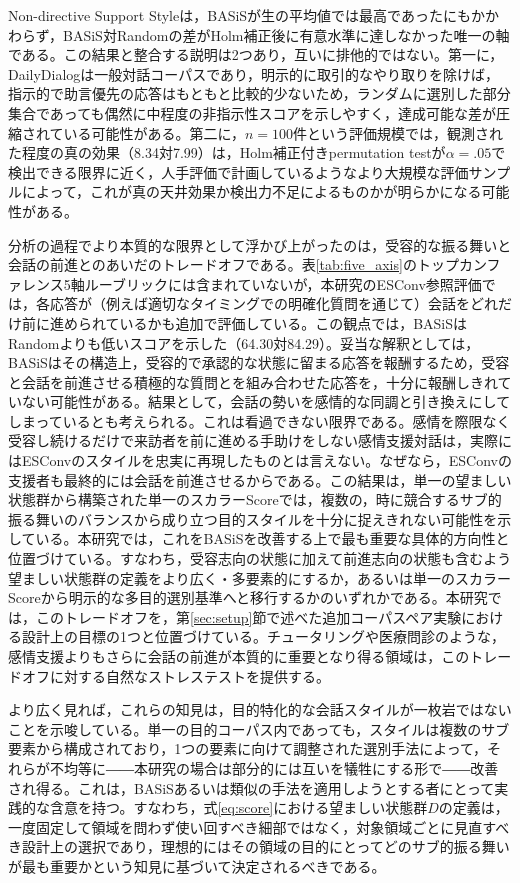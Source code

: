 \documentclass[manuscript,review,anonymous]{acmart}
\begin{document}
Non-directive Support Styleは，BASiSが生の平均値では最高であったにもかかわらず，BASiS対Randomの差がHolm補正後に有意水準に達しなかった唯一の軸である。この結果と整合する説明は2つあり，互いに排他的ではない。第一に，DailyDialogは一般対話コーパスであり，明示的に取引的なやり取りを除けば，指示的で助言優先の応答はもともと比較的少ないため，ランダムに選別した部分集合であっても偶然に中程度の非指示性スコアを示しやすく，達成可能な差が圧縮されている可能性がある。第二に，$n=100$件という評価規模では，観測された程度の真の効果（8.34対7.99）は，Holm補正付きpermutation testが$\alpha=.05$で検出できる限界に近く，人手評価で計画しているようなより大規模な評価サンプルによって，これが真の天井効果か検出力不足によるものかが明らかになる可能性がある。

分析の過程でより本質的な限界として浮かび上がったのは，受容的な振る舞いと会話の前進とのあいだのトレードオフである。表\ref{tab:five_axis}のトップカンファレンス5軸ルーブリックには含まれていないが，本研究のESConv参照評価では，各応答が（例えば適切なタイミングでの明確化質問を通じて）会話をどれだけ前に進められているかも追加で評価している。この観点では，BASiSはRandomよりも低いスコアを示した（64.30対84.29）。妥当な解釈としては，BASiSはその構造上，受容的で承認的な状態に留まる応答を報酬するため，受容と会話を前進させる積極的な質問とを組み合わせた応答を，十分に報酬しきれていない可能性がある。結果として，会話の勢いを感情的な同調と引き換えにしてしまっているとも考えられる。これは看過できない限界である。感情を際限なく受容し続けるだけで来訪者を前に進める手助けをしない感情支援対話は，実際にはESConvのスタイルを忠実に再現したものとは言えない。なぜなら，ESConvの支援者も最終的には会話を前進させるからである。この結果は，単一の望ましい状態群から構築された単一のスカラーScoreでは，複数の，時に競合するサブ的振る舞いのバランスから成り立つ目的スタイルを十分に捉えきれない可能性を示している。本研究では，これをBASiSを改善する上で最も重要な具体的方向性と位置づけている。すなわち，受容志向の状態に加えて前進志向の状態も含むよう望ましい状態群の定義をより広く・多要素的にするか，あるいは単一のスカラーScoreから明示的な多目的選別基準へと移行するかのいずれかである。本研究では，このトレードオフを，第\ref{sec:setup}節で述べた追加コーパスペア実験における設計上の目標の1つと位置づけている。チュータリングや医療問診のような，感情支援よりもさらに会話の前進が本質的に重要となり得る領域は，このトレードオフに対する自然なストレステストを提供する。

より広く見れば，これらの知見は，目的特化的な会話スタイルが一枚岩ではないことを示唆している。単一の目的コーパス内であっても，スタイルは複数のサブ要素から構成されており，1つの要素に向けて調整された選別手法によって，それらが不均等に――本研究の場合は部分的には互いを犠牲にする形で――改善され得る。これは，BASiSあるいは類似の手法を適用しようとする者にとって実践的な含意を持つ。すなわち，式\eqref{eq:score}における望ましい状態群$D$の定義は，一度固定して領域を問わず使い回すべき細部ではなく，対象領域ごとに見直すべき設計上の選択であり，理想的にはその領域の目的にとってどのサブ的振る舞いが最も重要かという知見に基づいて決定されるべきである。
\end{document}
